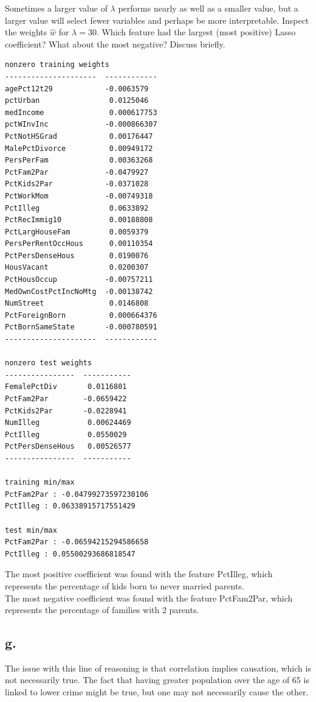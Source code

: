 \documentclass{article}
\newcommand{\1}{\mathbf{1}}
\begin{document}
{Sometimes a larger value of $\lambda$ performs nearly as well as a smaller value, but a larger value will select fewer variables and perhaps be more interpretable.  Inspect the weights $\hat{w}$ for $\lambda = 30$.  Which feature
had the largest (most positive) Lasso coefficient? What about the most negative? Discuss briefly. \\

\begin{verbatim}
nonzero training weights
---------------------  ------------
agePct12t29            -0.0063579
pctUrban                0.0125046
medIncome               0.000617753
pctWInvInc             -0.000866307
PctNotHSGrad            0.00176447
MalePctDivorce          0.00949172
PersPerFam              0.00363268
PctFam2Par             -0.0479927
PctKids2Par            -0.0371028
PctWorkMom             -0.00749318
PctIlleg                0.0633892
PctRecImmig10           0.00188808
PctLargHouseFam         0.0059379
PersPerRentOccHous      0.00110354
PctPersDenseHous        0.0190076
HousVacant              0.0200307
PctHousOccup           -0.00757211
MedOwnCostPctIncNoMtg  -0.00138742
NumStreet               0.0146808
PctForeignBorn          0.000664376
PctBornSameState       -0.000780591
---------------------  ------------

nonzero test weights
----------------  -----------
FemalePctDiv       0.0116801
PctFam2Par        -0.0659422
PctKids2Par       -0.0228941
NumIlleg           0.00624469
PctIlleg           0.0550029
PctPersDenseHous   0.00526577
----------------  -----------

training min/max
PctFam2Par : -0.04799273597230106
PctIlleg : 0.06338915717551429

test min/max
PctFam2Par : -0.06594215294586658
PctIlleg : 0.05500293686818547

\end{verbatim}

The most positive coefficient was found with the feature PctIlleg, which represents the percentage of kids born to never married parents. \\
The most negative coefficient was found with the feature PctFam2Par, which represents the percentage of families with 2 parents.

\subsection*{g.}

The issue with this line of reasoning is that correlation implies causation, which is not necessarily true. The fact that having greater population over the age of 65 is linked to lower crime might be true, but one may not necessarily cause the other. 

}
\end{document}
